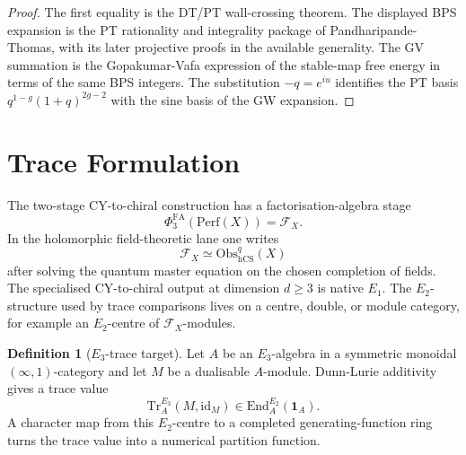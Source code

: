 \documentclass[11pt]{article}
\theoremstyle{definition}
\newtheorem{definition}[theorem]{Definition}
\providecommand{\cF}{\mathcal{F}}
\providecommand{\Perf}{\mathrm{Perf}}
\providecommand{\End}{\mathrm{End}}
\providecommand{\Obs}{\mathrm{Obs}}
\providecommand{\hCS}{\mathrm{hCS}}
\providecommand{\Tr}{\mathrm{Tr}}
\providecommand{\Eone}{E_1}
\providecommand{\Etwo}{E_2}
\providecommand{\Ethree}{E_3}
\providecommand{\PhiFA}{\Phi^{\mathrm{FA}}}
\begin{document}
\begin{proof}
The first equality is the DT/PT wall-crossing theorem.  The displayed
BPS expansion is the PT rationality and integrality package of
Pandharipande-Thomas, with its later projective proofs in the available
generality.  The GV summation is the Gopakumar-Vafa expression of the
stable-map free energy in terms of the same BPS integers.  The
substitution \(-q=e^{iu}\) identifies the PT basis
\(q^{1-g}(1+q)^{2g-2}\) with the sine basis of the GW expansion.
\end{proof}

\section{Trace Formulation}

The two-stage CY-to-chiral construction has a factorisation-algebra
stage
\[
  \PhiFA_3(\Perf(X))=\cF_X.
\]
In the holomorphic field-theoretic lane one writes
\[
  \cF_X\simeq\Obs^q_{\hCS}(X)
\]
after solving the quantum master equation on the chosen completion of
fields.  The specialised CY-to-chiral output at dimension \(d\ge3\) is
native \(\Eone\).  The \(\Etwo\)-structure used by trace comparisons
lives on a centre, double, or module category, for example an
\(\Etwo\)-centre of \(\cF_X\)-modules.

\begin{definition}[\(\Ethree\)-trace target]
Let \(A\) be an \(\Ethree\)-algebra in a symmetric monoidal
\((\infty,1)\)-category and let \(M\) be a dualisable \(A\)-module.
Dunn-Lurie additivity gives a trace value
\[
  \Tr_A^{\Ethree}(M,\mathrm{id}_M)
  \in
  \End_A^{\Etwo}(\mathbf 1_A).
\]
A character map from this \(\Etwo\)-centre to a completed
generating-function ring turns the trace value into a numerical
partition function.
\end{definition}
\end{document}

